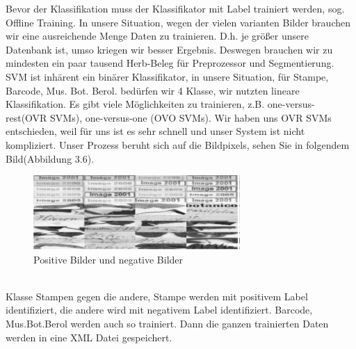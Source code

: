 \documentclass[10pt,a4paper]{report}
\begin{document}
Bevor der Klassifikation muss der Klassifikator mit Label trainiert werden, sog. Offline Training. In unsere Situation, wegen der vielen varianten Bilder brauchen wir eine ausreichende Menge Daten zu trainieren. D.h. je größer unsere Datenbank ist, umso kriegen wir besser Ergebnis. Deswegen brauchen wir zu mindesten ein paar tausend Herb-Beleg für Preprozessor und Segmentierung.
SVM ist inhärent ein binärer Klassifikator, in unsere Situation, für Stampe, Barcode, Mus. Bot. Berol. bedürfen wir 4 Klasse, wir nutzten lineare Klassifikation. Es gibt viele Möglichkeiten zu trainieren, z.B. one-versus-rest(OVR SVMs), one-versus-one (OVO SVMs). Wir haben uns OVR SVMs entschieden, weil für uns ist es sehr schnell und unser System ist nicht kompliziert. Unser Prozess beruht sich auf die Bildpixels, sehen Sie in folgendem Bild(Abbildung 3.6).\\
\begin{figure}[htbp] 
	\centering
	\includegraphics[width=0.7\textwidth]{Positivnegativ.png}
	\caption{Positive Bilder und negative Bilder}
	\label{fig:Bild 7}
\end{figure}\\
Klasse Stampen gegen die andere, Stampe werden mit positivem Label identifiziert, die andere wird mit negativem Label identifiziert. Barcode, Mus.Bot.Berol werden auch so trainiert. Dann die ganzen trainierten Daten  werden in eine XML Datei gespeichert.
\end{document}
